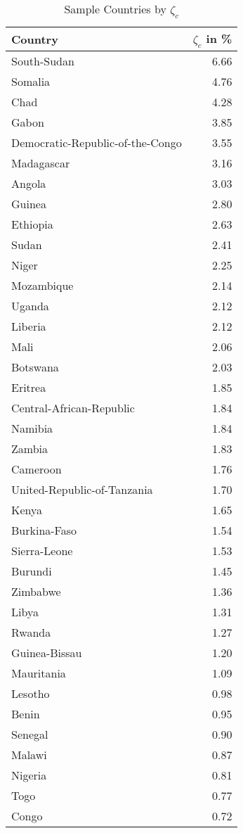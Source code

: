 \documentclass[11pt, oneside]{article}   	%
\begin{document}
\begin{table}[ht]
\centering
\caption{Sample Countries by $\zeta_{c}$}
\begin{tabular}{lr}
  \hline
Country & $\zeta_{c}$ in \% \\
  \hline
  South-Sudan & 6.66 \\
  Somalia & 4.76 \\
  Chad & 4.28 \\
  Gabon & 3.85 \\
  Democratic-Republic-of-the-Congo & 3.55 \\
  Madagascar & 3.16 \\
  Angola & 3.03 \\
  Guinea & 2.80 \\
  Ethiopia & 2.63 \\
  Sudan & 2.41 \\
  Niger & 2.25 \\
  Mozambique & 2.14 \\
  Uganda & 2.12 \\
  Liberia & 2.12 \\
  Mali & 2.06 \\
  Botswana & 2.03 \\
  Eritrea & 1.85 \\
  Central-African-Republic & 1.84 \\
  Namibia & 1.84 \\
  Zambia & 1.83 \\
  Cameroon & 1.76 \\
  United-Republic-of-Tanzania & 1.70 \\
  Kenya & 1.65 \\
  Burkina-Faso & 1.54 \\
  Sierra-Leone & 1.53 \\
  Burundi & 1.45 \\
  Zimbabwe & 1.36 \\
  Libya & 1.31 \\
  Rwanda & 1.27 \\
  Guinea-Bissau & 1.20 \\
  Mauritania & 1.09 \\
  Lesotho & 0.98 \\
  Benin & 0.95 \\
  Senegal & 0.90 \\
  Malawi & 0.87 \\
  Nigeria & 0.81 \\
  Togo & 0.77 \\
  Congo & 0.72 \\

\end{tabular}
\end{table}
\end{document}
